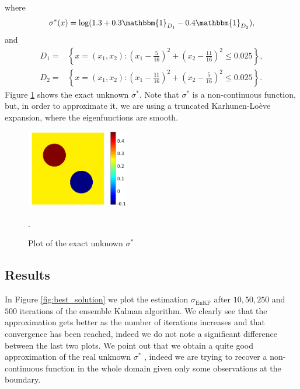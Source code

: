 \documentclass[10pt]{article}
\begin{document}
where
\begin{equation*}
\sigma^*(x) = \log (1.3 + 0.3 \mathbbm{1}_{D_1} - 0.4 \mathbbm{1}_{D_2}),
\end{equation*}
and
\begin{align*}
D_1 = & \left \{ x = (x_1,x_2) \colon \left ( x_1 - \frac{5}{16} \right )^2 + \left ( x_2 - \frac{11}{16} \right )^2 \le 0.025 \right \}, \\
D_2 = & \left \{ x = (x_1,x_2) \colon \left ( x_1 - \frac{11}{16} \right )^2 + \left ( x_2 - \frac{5}{16} \right )^2 \le 0.025 \right \}.
\end{align*}
Figure \ref{fig:exact_unknown} shows the exact unknown $\sigma^*$. Note that $\sigma^*$ is a non-continuous function, but, in order to approximate it, we are using a truncated Karhunen-Lo\`eve expansion, where the eigenfunctions are smooth.

\begin{figure}[t]
	\centering
	\includegraphics[width = 0.4\textwidth]{figures/sigma_exact}
	\caption{Plot of the exact unknown $\sigma^*$}.
	\label{fig:exact_unknown}
\end{figure}

\subsection{Results}

In Figure \ref{fig:best_solution} we plot the estimation $\sigma_{\mathrm{EnKF}}$ after $10, 50, 250$ and $500$ iterations of the ensemble Kalman algorithm. We clearly see that the approximation gets better as the number of iterations increases and that convergence has been reached, indeed we do not note a significant difference between the last two plots. We point out that we obtain a quite good approximation of the real unknown $\sigma^*$ , indeed we are trying to recover a non-continuous function in the whole domain given only some observations at the boundary.
\end{document}
